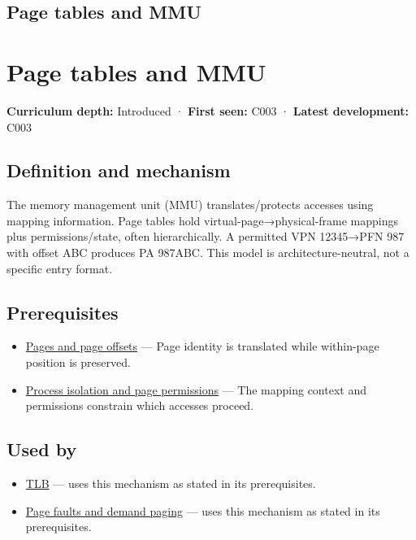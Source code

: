 \hypertarget{appendix-01e5905165c4}{}
\section*{Page tables and MMU}
\chapter{Page tables and MMU}\label{appendix-01e5905165c4-page-tables-and-mmu}

\textbf{Curriculum depth:} Introduced · \textbf{First seen:} C003 · \textbf{Latest development:} C003

\section{Definition and mechanism}\label{appendix-01e5905165c4-definition-and-mechanism}

The memory management unit (MMU) translates/protects accesses using mapping information. Page tables hold virtual-page→physical-frame mappings plus permissions/state, often hierarchically. A permitted VPN 12345→PFN 987 with offset ABC produces PA 987ABC. This model is architecture-neutral, not a specific entry format.

\section{Prerequisites}\label{appendix-01e5905165c4-prerequisites}

\begin{itemize}
\tightlist
\item
  \hyperref[appendix-0c67cd5bf30a]{Pages and page offsets} --- Page identity is translated while within-page position is preserved.
\item
  \hyperref[appendix-c2a9ad1e2b49]{Process isolation and page permissions} --- The mapping context and permissions constrain which accesses proceed.
\end{itemize}

\section{Used by}\label{appendix-01e5905165c4-used-by}

\begin{itemize}
\tightlist
\item
  \hyperref[appendix-7a2d9c5ce511]{TLB} --- uses this mechanism as stated in its prerequisites.
\item
  \hyperref[appendix-cc0909a7ef14]{Page faults and demand paging} --- uses this mechanism as stated in its prerequisites.
\end{itemize}

